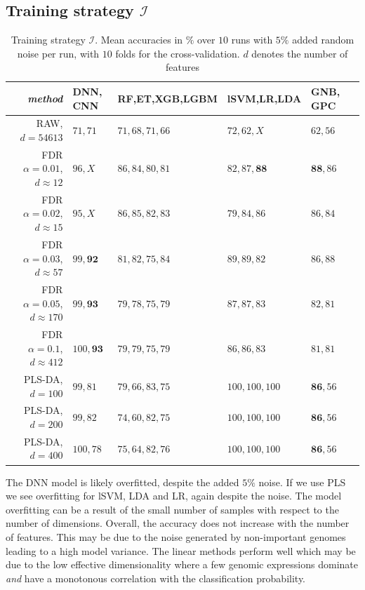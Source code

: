 \documentclass[a4paper,10pt]{article}
\begin{document}
\subsection{Training strategy $\mathcal{I}$}
%
\begin{table}[htp]
\centering
\begin{tabular}{rlllll}

\textit{method}						& DNN, CNN 		& RF,ET,XGB,LGBM	&  lSVM,LR,LDA		& GNB, GPC  			\\
							\hline
RAW, $d=54613$ 						& $71, 71$	 	&  $71, 68, 71, 66$	&  $72, 62, X$		&  $62, 56$  			\\
FDR $\alpha=0.01$, $d\approx 12$ 	& $96, X$  		&  $86, 84, 80, 81$	&  $82, 87, \mathbf{88}$&  $\mathbf{88}, 86$  		\\
FDR $\alpha=0.02$, $d\approx 15$ 	& $95, X$	  	&  $86, 85, 82, 83$	&  $79, 84, 86$		&  $86, 84$			\\
FDR $\alpha=0.03$, $d\approx 57$ 	& $99, \mathbf{92}$  	&  $81, 82, 75, 84$	&  $89, 89, 82$		&  $86, 88$			\\
FDR $\alpha=0.05$, $d\approx 170$ 	& $99, \mathbf{93}$  	&  $79, 78, 75, 79$	&  $87, 87, 83$		&  $82, 81$			\\
FDR $\alpha=0.1$,  $d\approx 412$ 	& $100,\mathbf{93}$	&  $79, 79, 75, 79$	&  $86, 86, 83$		&  $81, 81$			\\
PLS-DA, $d=100$ 					& $99, 81$		&  $79, 66, 83, 75$	&  $100, 100, 100$	&  $\mathbf{86}, 56$		\\
PLS-DA, $d=200$ 					& $99, 82$		&  $74, 60, 82, 75$	&  $100, 100, 100$  	&  $\mathbf{86}, 56$		\\
PLS-DA, $d=400$ 					& $100, 78$		&  $75, 64, 82, 76$	&  $100, 100, 100$  	&  $\mathbf{86}, 56$		
\end{tabular}
\caption{Training strategy $\mathcal{I}$. Mean accuracies in $\%$ over $10$ runs with $5\%$ added random noise per run, with $10$ folds for the cross-validation. $d$ denotes the number of features}
\label{tab:diversitymetrics}
\end{table}
%
The DNN model is likely overfitted, despite the added $5\%$ noise. If we use PLS we see overfitting for lSVM, LDA and LR, again despite the noise.
The model overfitting can be a result of the small number of samples with respect to the number of dimensions. Overall, the accuracy does not increase 
with the number of features. This may be due to the noise generated by non-important genomes leading to a high model variance. The linear methods perform well
which may be due to the low effective dimensionality where a few genomic expressions dominate \textit{and} have a monotonous correlation with the classification probability. \\ \\
\end{document}
